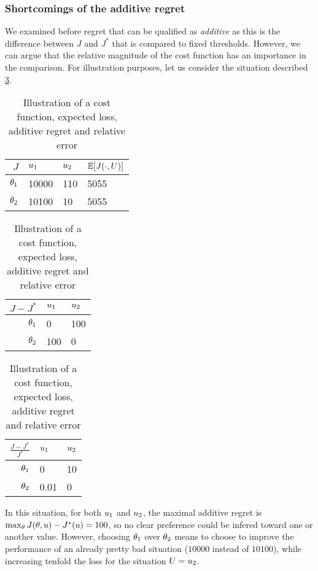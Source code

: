 \documentclass[../../Main_ManuscritThese.tex]{subfiles}
\begin{document}
\subsubsection{Shortcomings of the additive regret}
We examined before regret that can be qualified as \emph{additive} as this is the difference between $J$ and $J^*$ that is compared to fixed thresholds.
However, we can argue that the relative magnitude of the cost function has an importance in the comparison. For illustration purposes, let us consider the situation described \cref{tab:hyp_situation}.

\begin{table}[ht]
  \centering
  \begin{tabular}{rll|l}
    \toprule
    $J$     & $u_1$ & $u_2$ & $\mathbb{E}[J(\cdot, U)]$  \\ \midrule
    $\theta_1$ & 10000 & 110 & 5055 \\
    $\theta_2$ & 10100 & 10 & 5055 \\ \bottomrule
  \end{tabular}
  \quad
  \begin{tabular}{rll}
    \toprule
    $J-J^*$     & $u_1$ & $u_2$  \\ \midrule
    $\theta_1$ & 0 & 100 \\
    $\theta_2$ & 100 & 0  \\ \bottomrule
  \end{tabular}
    \quad
  \begin{tabular}{rll}
    \toprule
    $\frac{J-J^*}{J^*}$     & $u_1$ & $u_2$  \\ \midrule
    $\theta_1$ & 0 & 10 \\
    $\theta_2$ & 0.01 & 0  \\ \bottomrule
  \end{tabular}  
  \caption{\label{tab:hyp_situation} Illustration of a cost function, expected loss, additive regret and relative error}
\end{table}
In this situation, for both $u_1$ and $u_2$, the maximal additive regret is $\max_{\theta} J(\theta, u) - J^*(u) = 100$, so no clear preference could be infered toward one or another value. %
However, choosing $\theta_1$ over $\theta_2$ means to choose to improve the performance of an already pretty bad situation ($10000$ instead of $10100$), while increasing tenfold the loss for the situation $U=u_2$. 
\end{document}
